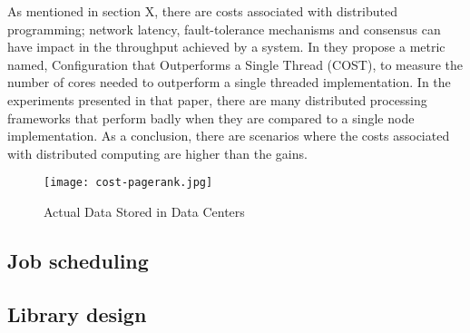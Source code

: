 As mentioned in section X, there are costs associated with distributed
programming; network latency, fault-tolerance mechanisms and consensus can have
impact in the throughput achieved by a system. In \cite{189908} they propose a
metric named, Configuration that Outperforms a Single Thread (COST), to measure
the number of cores needed to outperform a single threaded implementation. In
the experiments presented in that paper, there are many distributed processing
frameworks that perform badly when they are compared to a single node
implementation. As a conclusion, there are scenarios where the costs associated
with distributed computing are higher than the gains.

\begin{figure}[!h]
\begin{center}
\texttt{[image: cost-pagerank.jpg]}
\caption{Actual Data Stored in Data Centers\cite{189908}}
\label{fig:cost-pagerankc}
\end{center}
\end{figure}

\subsection{Job scheduling}

\subsection{Library design}
